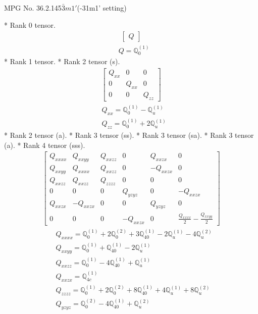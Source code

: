 \documentclass[fleqn,8pt,landscape]{jsarticle}
\begin{document}
\setcounter{MaxMatrixCols}{32}

\renewcommand{\tablename}{Table~}
\renewcommand{\figurename}{Figure~}
\begin{center}
\LARGE
MPG No. 36.2.145\quad$\bar{3}m1'$\quad(-31m1' setting)
\end{center}
* Rank 0 tensor.
\begin{align*}
\begin{bmatrix} Q \end{bmatrix}
\end{align*}
\begin{align*}
& Q = \mathbb{Q}_{0}^{(1)}
\end{align*}
* Rank 1 tensor.
* Rank 2 tensor (s).
\begin{align*}
\begin{bmatrix} Q_{xx} & 0 & 0 \\ 0 & Q_{xx} & 0 \\ 0 & 0 & Q_{zz} \end{bmatrix}
\end{align*}
\begin{align*}
& Q_{xx} = \mathbb{Q}_{0}^{(1)} - \mathbb{Q}_{u}^{(1)} \\
& Q_{zz} = \mathbb{Q}_{0}^{(1)} + 2 \mathbb{Q}_{u}^{(1)}
\end{align*}
* Rank 2 tensor (a).
* Rank 3 tensor (ss).
* Rank 3 tensor (sa).
* Rank 3 tensor (a).
* Rank 4 tensor (sss).
\begin{align*}
\begin{bmatrix} Q_{xxxx} & Q_{xxyy} & Q_{xxzz} & 0 & Q_{xxzx} & 0 \\ Q_{xxyy} & Q_{xxxx} & Q_{xxzz} & 0 & - Q_{xxzx} & 0 \\ Q_{xxzz} & Q_{xxzz} & Q_{zzzz} & 0 & 0 & 0 \\ 0 & 0 & 0 & Q_{yzyz} & 0 & - Q_{xxzx} \\ Q_{xxzx} & - Q_{xxzx} & 0 & 0 & Q_{yzyz} & 0 \\ 0 & 0 & 0 & - Q_{xxzx} & 0 & \frac{Q_{xxxx}}{2} - \frac{Q_{xxyy}}{2} \end{bmatrix}
\end{align*}
\begin{align*}
& Q_{xxxx} = \mathbb{Q}_{0}^{(1)} + 2 \mathbb{Q}_{0}^{(2)} + 3 \mathbb{Q}_{40}^{(1)} - 2 \mathbb{Q}_{u}^{(1)} - 4 \mathbb{Q}_{u}^{(2)} \\
& Q_{xxyy} = \mathbb{Q}_{0}^{(1)} + \mathbb{Q}_{40}^{(1)} - 2 \mathbb{Q}_{u}^{(1)} \\
& Q_{xxzz} = \mathbb{Q}_{0}^{(1)} - 4 \mathbb{Q}_{40}^{(1)} + \mathbb{Q}_{u}^{(1)} \\
& Q_{xxzx} = \mathbb{Q}_{4c}^{(1)} \\
& Q_{zzzz} = \mathbb{Q}_{0}^{(1)} + 2 \mathbb{Q}_{0}^{(2)} + 8 \mathbb{Q}_{40}^{(1)} + 4 \mathbb{Q}_{u}^{(1)} + 8 \mathbb{Q}_{u}^{(2)} \\
& Q_{yzyz} = \mathbb{Q}_{0}^{(2)} - 4 \mathbb{Q}_{40}^{(1)} + \mathbb{Q}_{u}^{(2)}
\end{align*}
\end{document}
